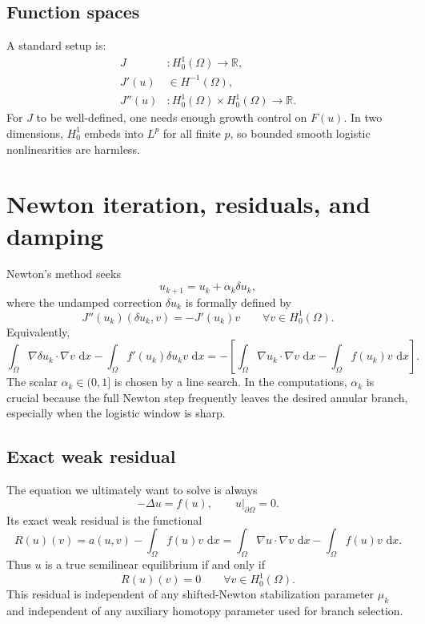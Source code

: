\documentclass[11pt,a4paper]{article}
\newcommand{\Om}{\Omega}
\newcommand{\R}{\mathbb{R}}
\newcommand{\dd}{\,\mathrm{d}}
\begin{document}
\subsection{Function spaces}

A standard setup is:
\begin{align}
  J &: H_0^1(\Om)\to \R,\nonumber\\
  J'(u)&\in H^{-1}(\Om),\nonumber\\
  J''(u)&:H_0^1(\Om)\times H_0^1(\Om)\to\R.
\end{align}
For $J$ to be well-defined, one needs enough growth control on $F(u)$. In two dimensions, $H_0^1$ embeds into $L^p$ for all finite $p$, so bounded smooth logistic nonlinearities are harmless.


\section{Newton iteration, residuals, and damping}

Newton's method seeks
\begin{equation}
  u_{k+1}=u_k+\alpha_k\delta u_k,
\end{equation}
where the undamped correction $\delta u_k$ is formally defined by
\begin{equation}
  J''(u_k)(\delta u_k,v)=-J'(u_k)v
  \qquad\forall v\in H_0^1(\Om).
\end{equation}
Equivalently,
\begin{equation}
  \int_\Om \nabla\delta u_k\cdot\nabla v\,\dd x
  -\int_\Om f'(u_k)\delta u_k v\,\dd x
  =-
  \left[
  \int_\Om\nabla u_k\cdot\nabla v\,\dd x
  -\int_\Om f(u_k)v\,\dd x
  \right].
\end{equation}
The scalar $\alpha_k\in(0,1]$ is chosen by a line search. In the computations,
$\alpha_k$ is crucial because the full Newton step frequently leaves the desired
annular branch, especially when the logistic window is sharp.

\subsection{Exact weak residual}

The equation we ultimately want to solve is always
\begin{equation}
  -\Delta u=f(u),
  \qquad u|_{\partial\Om}=0.
\end{equation}
Its exact weak residual is the functional
\begin{equation}
  R(u)(v)
  =a(u,v)-\int_\Om f(u)v\,\dd x
  =\int_\Om \nabla u\cdot\nabla v\,\dd x
  -\int_\Om f(u)v\,\dd x.
\end{equation}
Thus $u$ is a true semilinear equilibrium if and only if
\begin{equation}
  R(u)(v)=0
  \qquad\forall v\in H_0^1(\Om).
\end{equation}
This residual is independent of any shifted-Newton stabilization parameter
$\mu_k$ and independent of any auxiliary homotopy parameter used for branch
selection.
\end{document}
